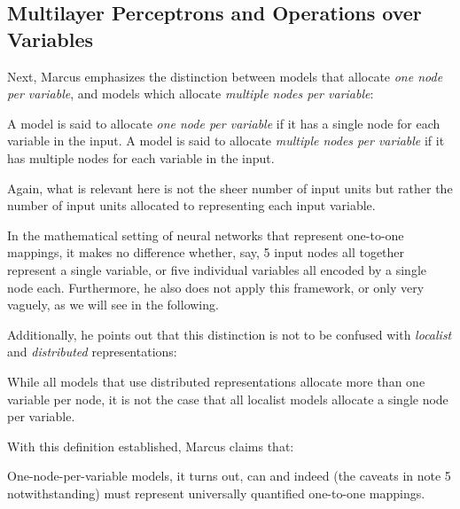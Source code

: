 \documentclass[../../main.tex]{subfiles}
\begin{document}
\subsection{Multilayer Perceptrons and Operations over Variables}
Next, Marcus emphasizes the distinction between models that allocate \emph{one node per variable}, and models which allocate \emph{multiple nodes per variable}:

\begin{definition}
    A model is said to allocate \emph{one node per variable} if it has a single node for each variable in the input. A model is said to allocate \emph{multiple nodes per variable} if it has multiple nodes for each variable in the input.
\end{definition}

\begin{citecallout}
    Again, what is relevant here is not the sheer number of input units
    but rather the number of input units allocated to representing each input
    variable.
\end{citecallout}

\begin{critique}
    In the mathematical setting of neural networks that represent one-to-one mappings, it makes no difference whether, say, 5 input nodes all together represent a single variable, or five individual variables all encoded by a single node each. Furthermore, he also does not apply this framework, or only very vaguely, as we will see in the  following.
\end{critique}

Additionally, he points out that this distinction is not to be confused with \emph{localist} and \emph{distributed} representations:

\begin{citecallout}
    While all models that use distributed representations allocate more than one variable per node, it is
    not the case that all localist models allocate a single node per variable.
\end{citecallout}

With this definition established, Marcus claims that:

\begin{citecallout}
    One-node-per-variable models, it turns out, can and indeed (the caveats in note 5 notwithstanding) must represent universally
    quantified one-to-one mappings.
\end{citecallout}
\end{document}

